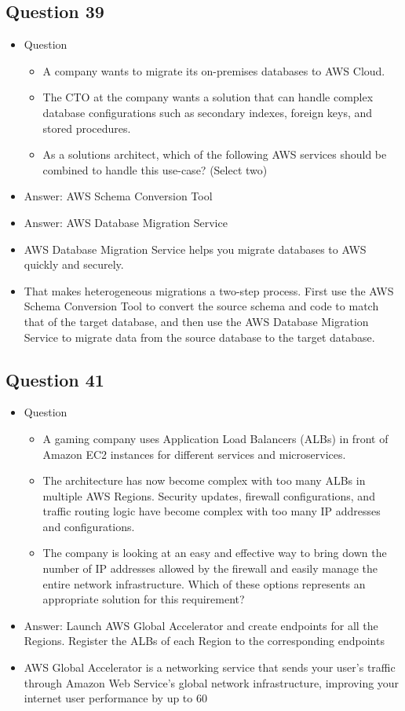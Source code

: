 \documentclass[]{scrartcl}
\begin{document}
\subsection{Question 39}
\begin{itemize}
	\item Question
	\begin{itemize}
		\item A company wants to migrate its on-premises databases to AWS Cloud. 
		\item The CTO at the company wants a solution that can handle complex database configurations such as secondary indexes, foreign keys, and stored procedures.
		\item As a solutions architect, which of the following AWS services should be combined to handle this use-case? (Select two)
	\end{itemize}
	\item Answer: AWS Schema Conversion Tool
	\item Answer: AWS Database Migration Service
	\item AWS Database Migration Service helps you migrate databases to AWS quickly and securely.
	\item That makes heterogeneous migrations a two-step process. First use the AWS Schema Conversion Tool to convert the source schema and code to match that of the target database, and then use the AWS Database Migration Service to migrate data from the source database to the target database. 
\end{itemize}

\subsection{Question 41}
\begin{itemize}
	\item Question
	\begin{itemize}
		\item A gaming company uses Application Load Balancers (ALBs) in front of Amazon EC2 instances for different services and microservices. 
		\item The architecture has now become complex with too many ALBs in multiple AWS Regions. Security updates, firewall configurations, and traffic routing logic have become complex with too many IP addresses and configurations.
		\item The company is looking at an easy and effective way to bring down the number of IP addresses allowed by the firewall and easily manage the entire network infrastructure. Which of these options represents an appropriate solution for this requirement?
	\end{itemize}
	\item Answer: Launch AWS Global Accelerator and create endpoints for all the Regions. Register the ALBs of each Region to the corresponding endpoints
	\item AWS Global Accelerator is a networking service that sends your user’s traffic through Amazon Web Service’s global network infrastructure, improving your internet user performance by up to 60%
\end{itemize}
\end{document}
